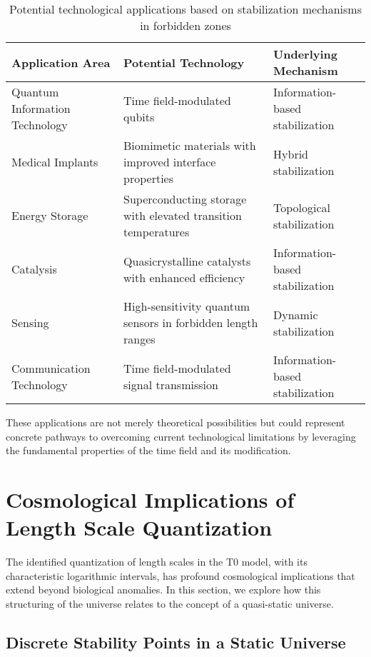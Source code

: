 \documentclass[12pt,a4paper]{article}
\begin{document}
	\begin{table}[h]
		\centering
		\begin{adjustbox}{scale=0.65}
			\begin{tabular}{lll}
				\hline
				\textbf{Application Area} & \textbf{Potential Technology} & \textbf{Underlying Mechanism} \\
				\hline
				Quantum Information Technology & Time field-modulated qubits & Information-based stabilization \\
				Medical Implants & Biomimetic materials with improved interface properties & Hybrid stabilization \\
				Energy Storage & Superconducting storage with elevated transition temperatures & Topological stabilization \\
				Catalysis & Quasicrystalline catalysts with enhanced efficiency & Information-based stabilization \\
				Sensing & High-sensitivity quantum sensors in forbidden length ranges & Dynamic stabilization \\
				Communication Technology & Time field-modulated signal transmission & Information-based stabilization \\
				\hline
			\end{tabular}
		\end{adjustbox}
		\caption{Potential technological applications based on stabilization mechanisms in forbidden zones}
		\label{tab:applications}
	\end{table}
	
	These applications are not merely theoretical possibilities but could represent concrete pathways to overcoming current technological limitations by leveraging the fundamental properties of the time field and its modification.
	
	\section{Cosmological Implications of Length Scale Quantization}
	\label{sec:kosmologische_implikationen}
	
	The identified quantization of length scales in the T0 model, with its characteristic logarithmic intervals, has profound cosmological implications that extend beyond biological anomalies. In this section, we explore how this structuring of the universe relates to the concept of a quasi-static universe.
	
	\subsection{Discrete Stability Points in a Static Universe}
	\label{subsec:stabilitaetspunkte}
	
\end{document}
